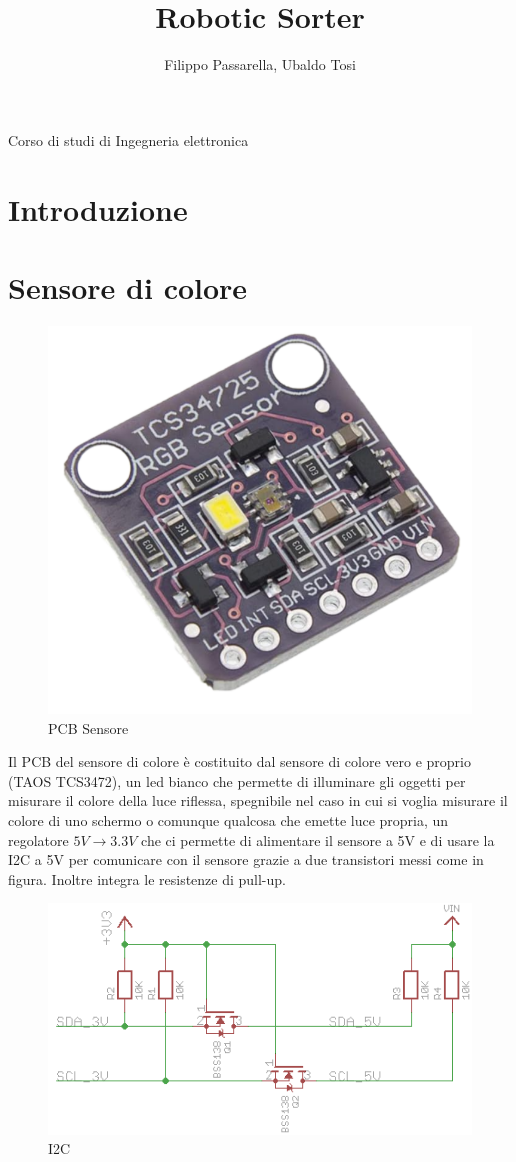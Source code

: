 \documentclass[a4paper,12pt]{report}
\title{Robotic Sorter}
\author{Filippo Passarella, Ubaldo Tosi}
\begin{document}
\maketitle
\begin{center}
    Corso di studi di Ingegneria elettronica
\end{center}

\newpage
\section{Introduzione}
\section {Sensore di colore}
\begin{figure}
    \includegraphics[width=0.8\linewidth]{images/Immagini sensore/pcb sensore.png}
    \caption{PCB Sensore}
\end{figure}
Il PCB del sensore di colore è costituito dal sensore di colore vero e proprio (TAOS TCS3472), un led bianco che permette di illuminare gli oggetti per misurare il colore della luce riflessa, spegnibile nel caso in cui si voglia misurare il colore di uno schermo o comunque qualcosa che emette luce propria, un regolatore $5V \rightarrow 3.3V$ che ci permette di alimentare il sensore a 5V e di usare la I2C a 5V per comunicare con il sensore grazie a due transistori messi come in figura. Inoltre integra le resistenze di pull-up.
\begin{figure}[h]
    \centering
    \includegraphics[width=0.35\linewidth]{images/Immagini sensore/I2C_3.3 to 5.png}
    \caption{I2C}
\end{figure}
\end{document}
